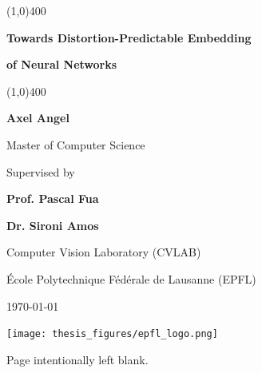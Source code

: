 \documentclass[a4paper,12pt]{report}
\newcommand{\myname}{Axel Angel}
\begin{document}
\begin{titlepage}
\begin{center}
    \vspace*{0.5cm}

    \line(1,0){400}
    \vspace{0.5cm}

    {\bf \Large Towards Distortion-Predictable Embedding}

    \vspace{0.5cm}

    {\bf \Large of Neural Networks}

    \vspace{0.5cm}
    \line(1,0){400}

    \vspace{1.5cm}

    {\bf \myname}

    Master of Computer Science

    \vspace{1.6cm}

    Supervised by

    {\bf Prof. Pascal Fua}

    {\bf Dr. Sironi Amos}

    \vspace{0.8cm}

    Computer Vision Laboratory (CVLAB)

    École Polytechnique Fédérale de Lausanne (EPFL)

    \vspace{3cm}

    \today

    \vfill

    \texttt{[image: thesis\_figures/epfl\_logo.png]}


    \end{center}
\end{titlepage}

\newpage
\thispagestyle{empty}
\vfill
\begin{center}
    Page intentionally left blank.
\end{center}
\end{document}
